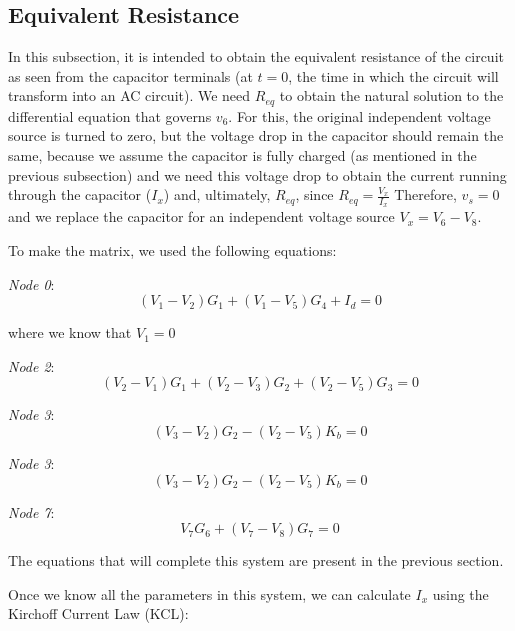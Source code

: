 \subsection{Equivalent Resistance}
\label{subsec:Req_theory}

In this subsection, it is intended to obtain the equivalent resistance of the circuit as seen from the capacitor terminals (at $t=0$, the time in which the circuit will transform into an AC circuit). We need $R_{eq}$ to obtain the natural solution to the differential equation that governs $v_6$. For this, the original independent voltage source is turned to zero, but the voltage drop in the capacitor should remain the same, because we assume the capacitor is fully charged (as mentioned in the previous subsection) and we need this voltage drop to obtain the current running through the capacitor ($I_x$) and, ultimately, $R_{eq}$, since $R_{eq} = \frac{V_x}{I_x}$ Therefore, $v_s = 0$ and we replace the capacitor for an independent voltage source $V_x = V_6 - V_8$.

To make the matrix, we used the following equations:


\textit{Node 0}:
\begin{equation}
  (V_{1} - V_{2})G_{1} + (V_{1} - V_{5})G_{4} + I_d = 0
\end{equation}

where we know that $V_1=0$

\textit{Node 2}:
\begin{equation}
  (V_{2} - V_{1})G_{1} + (V_{2} - V_{3})G_{2} + (V_{2} - V_{5})G_{3}= 0
\end{equation}

\textit{Node 3}:
\begin{equation}
  (V_{3} - V_{2})G_{2} - (V_{2} - V_{5})K_{b} = 0
\end{equation}

\textit{Node 3}:
\begin{equation}
  (V_{3} - V_{2})G_{2} - (V_{2} - V_{5})K_{b} = 0
\end{equation}

\textit{Node 7}:
\begin{equation}
  V_{7}G_{6} + (V_{7} - V_{8})G_{7} = 0
\end{equation}


The equations that will complete this system are present in the previous section.

Once we know all the parameters in this system, we can calculate $I_x$ using the Kirchoff Current Law (KCL):


